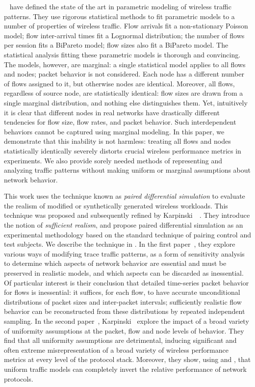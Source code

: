 \documentclass[twocolumn,final]{svjour3}
\begin{document}
\FHC~\cite{Hernandez06:spatio-temporal-modeling} have defined the state of the art in parametric modeling of wireless traffic patterns.
They use rigorous statistical methods to fit parametric models to a number of properties of wireless traffic.
Flow arrivals fit a non-stationary Poisson model;
flow inter-arrival times fit a Lognormal distribution;
the number of flows per session fits a BiPareto model;
flow sizes also fit a BiPareto model.
The statistical analysis fitting these parametric models is thorough and convincing.
The models, however, are marginal:
a single statistical model applies to all flows and nodes; packet behavior is not considered.
Each node has a different number of flows assigned to it, but otherwise nodes are identical. 
Moreover, all flows, regardless of source node, are statistically identical:
flow sizes are drawn from a single marginal distribution, and nothing else distinguishes them.
Yet, intuitively it is clear that different nodes in real networks have drastically different tendencies for flow size, flow rates, and packet behavior.
Such interdependent behaviors cannot be captured using marginal modeling.
In this paper, we demonstrate that this inability is not harmless:
treating all flows and nodes statistically identically severely distorts crucial wireless performance metrics in experiments.
We also provide sorely needed methods of representing and analyzing traffic patterns without making uniform or marginal assumptions about network behavior.

This work uses the technique known as \emph{paired differential simulation} to evaluate the realism of modified or synthetically generated wireless workloads.
This technique was proposed and subsequently refined by Karpinski~~\cite{Karpinski07:realism,Karpinski07:cbr-failure}.
They introduce the notion of \emph{sufficient realism}, and propose paired differential simulation as an experimental methodology based on the standard technique of pairing control and test subjects.
We describe the technique in .
In the first paper~\cite{Karpinski07:realism}, they explore various ways of modifying trace traffic patterns, as a form of sensitivity analysis to determine which aspects of network behavior are essential and must be preserved in realistic models, and which aspects can be discarded as inessential.
Of particular interest is their conclusion that detailed time-series packet behavior for flows is inessential:
it suffices, for each flow, to have accurate unconditional distributions of packet sizes and inter-packet intervals;
sufficiently realistic flow behavior can be reconstructed from these distributions by repeated independent sampling.
In the second paper~\cite{Karpinski07:cbr-failure}, Karpinski~ explore the impact of a broad variety of uniformity assumptions at the packet, flow and node levels of behavior.
They find that all uniformity assumptions are detrimental, inducing significant and often extreme misrepresentation of a broad variety of wireless performance metrics at every level of the protocol stack.
Moreover, they show, using  and , that uniform traffic models can completely invert the relative performance of network protocols.
\end{document}
